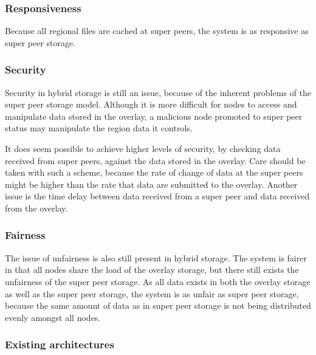 \documentclass[10pt,a4paper,journal,cspaper,compsoc]{IEEEtran}
\begin{document}
\subsubsection{Responsiveness}

Because all regional files are cached at super peers, the system is as responsive as super peer storage.

\subsubsection{Security}

Security in hybrid storage is still an issue, because of the inherent problems of the super peer storage model. Although it is more difficult for
nodes to access and manipulate data stored in the overlay, a malicious node promoted to super peer status may manipulate the region data it controls.

It does seem possible to achieve higher levels of security, by checking data received from super peers, against the data stored in the overlay. Care
should be taken with such a scheme, because the rate of change of data at the super peers might be higher than the rate that data are submitted to
the overlay. Another issue is the time delay between data received from a super peer and data received from the overlay.

\subsubsection{Fairness}

The issue of unfairness is also still present in hybrid storage. The system is fairer in that all nodes share the load of the overlay storage, but
there still exists the unfairness of the super peer storage. As all data exists in both the overlay storage as well as the super peer storage, the
system is as unfair as super peer storage, because the same amount of data as in super peer storage is not being distributed evenly amongst all
nodes.

\subsubsection{Existing architectures}
\end{document}
